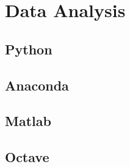 \section {Data Analysis}

\subsection{Python}

\subsection{Anaconda}

\subsection{Matlab}

\subsection{Octave}
